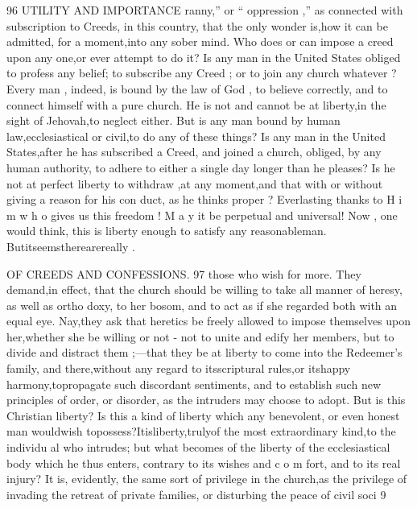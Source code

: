 \documentclass[
]{book}
\begin{document}
96 UTILITY AND IMPORTANCE
ranny,'' or `` oppression ,'' as connected with
subscription to Creeds, in this country, that
the only wonder is,how it can be admitted, for a moment,into any sober mind. Who
does or can impose a creed upon any one,or ever attempt to do it? Is any man in the
United States obliged to profess any belief; to subscribe any Creed ; or to join any church
whatever ? Every man , indeed, is bound by the law of God , to believe correctly, and to connect himself with a pure church. He is
not and cannot be at liberty,in the sight of
Jehovah,to neglect either. But is any man
bound by human law,ecclesiastical or civil,to
do any of these things? Is any man in the
United States,after he has subscribed a Creed,
and joined a church, obliged, by any human
authority, to adhere to either a single day
longer than he pleases? Is he not at perfect
liberty to withdraw ,at any moment,and that
with or without giving a reason for his con duct, as he thinks proper ? Everlasting thanks
to H i m w h o gives us this freedom ! M a y it be perpetual and universal! Now , one would
think, this is liberty enough to satisfy any reasonableman. Butitseemstherearereally
.

OF CREEDS AND CONFESSIONS. 97
those who wish for more. They demand,in effect, that the church should be willing to
take all manner of heresy, as well as ortho doxy, to her bosom, and to act as if she
regarded both with an equal eye. Nay,they ask that heretics be freely allowed to impose
themselves upon her,whether she be willing or not - not to unite and edify her members, but to divide and distract them ;---that they be
at liberty to come into the Redeemer's family, and there,without any regard to itsscriptural
rules,or itshappy harmony,topropagate such discordant sentiments, and to establish such new principles of order, or disorder, as the intruders may choose to adopt. But is this Christian liberty? Is this a kind of liberty which any benevolent, or even honest man wouldwish topossess?Itisliberty,trulyof the most extraordinary kind,to the individu al who intrudes; but what becomes of the liberty of the ecclesiastical body which he thus enters, contrary to its wishes and c o m fort, and to its real injury? It is, evidently, the same sort of privilege in the church,as the privilege of invading the retreat of private families, or disturbing the peace of civil soci
9
\end{document}
